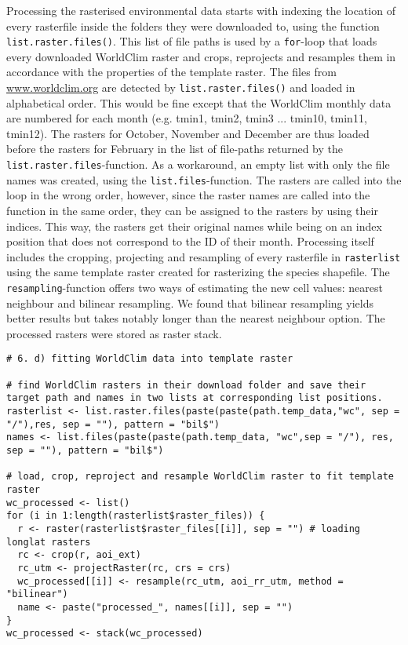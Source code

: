 \documentclass[11pt, a4paper]{article}\usepackage[]{graphicx}\usepackage[]{color}
\begin{document}
Processing the rasterised environmental data starts with indexing the location of every rasterfile inside the folders they were downloaded to, using the function \texttt{list.raster.files()}. This list of file paths is used by a \texttt{for}-loop that loads every downloaded WorldClim raster and crops, reprojects and resamples them in accordance with the properties of the template raster. The files from \url{www.worldclim.org} are detected by \texttt{list.raster.files()} and loaded in alphabetical order. This would be fine except that the WorldClim monthly data are numbered for each month (e.g. tmin1, tmin2, tmin3 ... tmin10, tmin11, tmin12). The rasters for October, November and December are thus loaded before the rasters for February in the list of file-paths returned by the \texttt{list.raster.files}-function. As a workaround, an empty list with only the file names was created, using the \texttt{list.files}-function. The rasters are called into the loop in the wrong order, however, since the raster names are called into the function in the same order, they can be assigned to the rasters by using their indices. This way, the rasters get their original names while being on an index position that does not correspond to the ID of their month.\newline
Processing itself includes the cropping, projecting and resampling of every rasterfile in \texttt{rasterlist} using the same template raster created for rasterizing the species shapefile. The \texttt{resampling}-function offers two ways of estimating the new cell values: nearest neighbour and bilinear resampling. We found that bilinear resampling yields better results but takes notably longer than the nearest neighbour option. The processed rasters were stored as raster stack.

\begin{verbatim}
# 6. d) fitting WorldClim data into template raster

# find WorldClim rasters in their download folder and save their target path and names in two lists at corresponding list positions.
rasterlist <- list.raster.files(paste(paste(path.temp_data,"wc", sep = "/"),res, sep = ""), pattern = "bil$")
names <- list.files(paste(paste(path.temp_data, "wc",sep = "/"), res, sep = ""), pattern = "bil$") 

# load, crop, reproject and resample WorldClim raster to fit template raster
wc_processed <- list()
for (i in 1:length(rasterlist$raster_files)) {
  r <- raster(rasterlist$raster_files[[i]], sep = "") # loading longlat rasters
  rc <- crop(r, aoi_ext)
  rc_utm <- projectRaster(rc, crs = crs)
  wc_processed[[i]] <- resample(rc_utm, aoi_rr_utm, method = "bilinear")
  name <- paste("processed_", names[[i]], sep = "")
}
wc_processed <- stack(wc_processed)
\end{verbatim}
\end{document}
